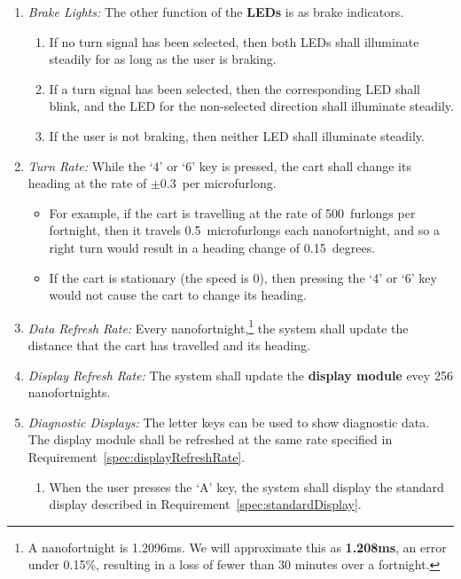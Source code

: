 \begin{enumerate}
\begin{enumerate}
        \end{enumerate}
    \item \textit{Brake Lights:} The other function of the \textbf{LEDs} is as brake indicators.
        \begin{enumerate}
            \item If no turn signal has been selected, then both LEDs shall illuminate steadily for as long as the user is braking.
            \item If a turn signal has been selected, then the corresponding LED shall blink, and the LED for the non-selected direction shall illuminate steadily.
            \item If the user is not braking, then neither LED shall illuminate steadily.
        \end{enumerate}
    \item \textit{Turn Rate:} While the `4' or `6' key is pressed, the cart shall change its heading at the rate of $\pm$0.3\textdegree~per microfurlong.
        \begin{itemize}
            \item For example, if the cart is travelling at the rate of 500~furlongs per fortnight, then it travels 0.5~microfurlongs each nanofortnight, and so a right turn would result in a heading change of 0.15~degrees.
            \item If the cart is stationary (the speed is 0), then pressing the `4' or `6' key would not cause the cart to change its heading.
        \end{itemize}
    \item \label{spec:dataRefreshRate} \textit{Data Refresh Rate:} Every nanofortnight,\footnote{
            A nanofortnight is 1.2096ms. We will approximate this as \textbf{1.208ms}, an error under 0.15\%, resulting in a loss of fewer than 30 minutes over a fortnight.
        } the system shall update the distance that the cart has travelled and its heading.
    \item \label{spec:displayRefreshRate} \textit{Display Refresh Rate:} The system shall update the \textbf{display module} evey 256 nanofortnights.
    \item \label{spec:diagnosticDisplays} \textit{Diagnostic Displays:} The letter keys can be used to show diagnostic data.
        The display module shall be refreshed at the same rate specified in Requirement~\ref{spec:displayRefreshRate}.
        \begin{enumerate}
            \item When the user presses the `A' key, the system shall display the standard display described in Requirement~\ref{spec:standardDisplay}.

\end{enumerate}
\end{enumerate}
